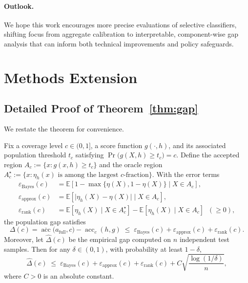 \paragraph{Outlook.}
We hope this work encourages more precise evaluations of selective classifiers, shifting focus from aggregate calibration to interpretable, component-wise gap analysis that can inform both technical improvements and policy safeguards.





\section{Methods Extension}
\label{sec:meth_ext}

\subsection{Detailed Proof of Theorem~\ref{thm:gap}}
\label{app:proof-gap-ranking}

We restate the theorem for convenience.

\begin{theorem}
Fix a coverage level \(c\in(0,1]\), a score function \(g(\cdot,h)\),
and its associated population threshold
\(t_c\) satisfying \(\Pr\bigl(g(X,h)\ge t_c\bigr)=c\).
Define the accepted region \(A_c:=\{x:g(x,h)\ge t_c\}\) and
the oracle region
\(A_c^{\star}:=\{x:\eta_h(x)\text{ is among the largest }c\text{-fraction}\}\).
With the error terms
\begin{align}
\varepsilon_{\mathrm{Bayes}}(c)
&= \mathbb{E}\left[1 - \max\{\eta(X), 1 - \eta(X)\} \mid X \in A_c \right], \\
\varepsilon_{\mathrm{approx}}(c)
&= \mathbb{E}\left[ \lvert \eta_h(X) - \eta(X) \rvert \mid X \in A_c \right], \\
\varepsilon_{\mathrm{rank}}(c)
&= \mathbb{E}\left[ \eta_h(X) \mid X \in A_c^{\star} \right]
 - \mathbb{E}\left[ \eta_h(X) \mid X \in A_c \right] \;\;(\ge 0),
\end{align}
the population gap satisfies
\begin{equation}
\label{eq:pop-gap-app}
\Delta(c)=\overline{\operatorname{acc}}\bigl(a_{\mathrm{full}},c\bigr)
-\operatorname{acc}_c(h,g)
\;\le\;
\varepsilon_{\mathrm{Bayes}}(c)
+\varepsilon_{\mathrm{approx}}(c)
+\varepsilon_{\mathrm{rank}}(c).
\end{equation}
Moreover, let \(\widehat{\Delta}(c)\) be the empirical gap computed on
\(n\) independent test samples.  Then for any
\(\delta\in(0,1)\), with probability at least \(1-\delta\),
\begin{equation}
\label{eq:emp-gap-app}
\widehat{\Delta}(c)
\;\le\;
\varepsilon_{\mathrm{Bayes}}(c)
+\varepsilon_{\mathrm{approx}}(c)
+\varepsilon_{\mathrm{rank}}(c)
+ C\sqrt{\frac{\log(1/\delta)}{n}},
\end{equation}
where \(C>0\) is an absolute constant.
\end{theorem}

